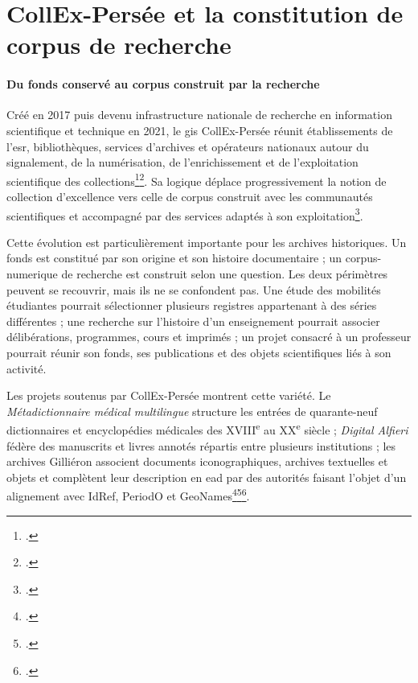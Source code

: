 
\section{CollEx-Persée et la constitution de corpus de recherche}

\paragraph{Du fonds conservé au corpus construit par la recherche}

Créé en 2017 puis devenu infrastructure nationale de recherche en information scientifique et technique en 2021, le \gls{gis} CollEx-Persée réunit établissements de l'\gls{esr}, bibliothèques, services d'archives et opérateurs nationaux autour du \gls{signalement}, de la numérisation, de l'enrichissement et de l'exploitation scientifique des collections\footcite{DesosWarnier2022}\footcite{CollExMissions}. Sa logique déplace progressivement la notion de collection d'excellence vers celle de corpus construit avec les communautés scientifiques et accompagné par des services adaptés à son exploitation\footcite{CollExFeuilleRoute2025}.

Cette évolution est particulièrement importante pour les archives historiques. Un fonds est constitué par son origine et son histoire documentaire ; un \gls{corpus-numerique} de recherche est construit selon une question. Les deux périmètres peuvent se recouvrir, mais ils ne se confondent pas. Une étude des mobilités étudiantes pourrait sélectionner plusieurs registres appartenant à des séries différentes ; une recherche sur l'histoire d'un enseignement pourrait associer délibérations, programmes, cours et imprimés ; un projet consacré à un professeur pourrait réunir son fonds, ses publications et des objets scientifiques liés à son activité.

Les projets soutenus par CollEx-Persée montrent cette variété. Le \emph{Métadictionnaire médical multilingue} structure les entrées de quarante-neuf dictionnaires et encyclopédies médicales des XVIII\textsuperscript{e} au XX\textsuperscript{e} siècle ; \emph{Digital Alfieri} fédère des manuscrits et livres annotés répartis entre plusieurs institutions ; les archives Gilliéron associent documents iconographiques, archives textuelles et objets et complètent leur description en \gls{ead} par des autorités faisant l'objet d'un \gls{alignement} avec IdRef, PeriodO et GeoNames\footcite{CollExMetadictionnaire}\footcite{CollExDigitalAlfieri}\footcite{CollExGillieron}.

